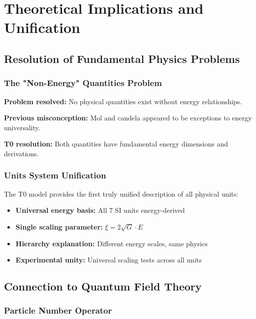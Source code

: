 \documentclass[12pt,a4paper]{article}
\newcommand{\xipar}{\xi}
\begin{document}
\section{Theoretical Implications and Unification}
\label{sec:theoretical_implications}

\subsection{Resolution of Fundamental Physics Problems}
\label{subsec:resolution_fundamental_problems}

\subsubsection{The "Non-Energy" Quantities Problem}
\label{subsubsec:non_energy_problem_resolved}

\textbf{Problem resolved:} No physical quantities exist without energy relationships.

\textbf{Previous misconception:} Mol and candela appeared to be exceptions to energy universality.

\textbf{T0 resolution:} Both quantities have fundamental energy dimensions and derivations.

\subsubsection{Units System Unification}
\label{subsubsec:units_system_unification}

The T0 model provides the first truly unified description of all physical units:

\begin{itemize}
	\item \textbf{Universal energy basis:} All 7 SI units energy-derived
	\item \textbf{Single scaling parameter:} $\xipar = 2\sqrt{G} \cdot E$
	\item \textbf{Hierarchy explanation:} Different energy scales, same physics
	\item \textbf{Experimental unity:} Universal scaling tests across all units
\end{itemize}

\subsection{Connection to Quantum Field Theory}
\label{subsec:qft_connection}

\subsubsection{Particle Number Operator}
\label{subsubsec:particle_number_operator}
\end{document}
